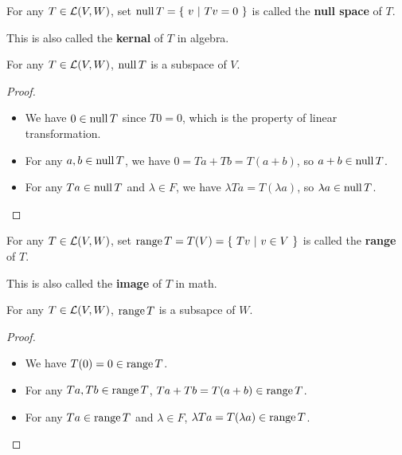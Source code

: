 \documentclass[../main.tex]{subfiles}
\begin{document}
\setcounter{definition}{10}
\begin{definition}
  For any $T \in \mathcal{L}(V, W)$, set $\operatorname{null} T = \{ \ v \ | \ Tv = 0 \ \}$ is called the \textbf{null space} of $T$.
\end{definition}

This is also called the \textbf{kernal} of $T$ in algebra.

\setcounter{theorem}{12}
\begin{theorem}
  For any $T \in \mathcal{L}(V, W)$, $\operatorname{null} T$ is a subspace of $V$.
\end{theorem}
\begin{proof}
  ~
  \begin{itemize}
    \item We have $0 \in \operatorname{null} T$ since $T0 = 0$, which is the property of linear transformation.
    \item For any $a, b \in \operatorname{null} T$, we have $0 = Ta + Tb = T(a + b)$, so $a + b \in \operatorname{null} T$.
    \item For any $Ta \in \operatorname{null} T$ and $\lambda \in F$, we have $\lambda Ta = T (\lambda a)$, so $\lambda a \in \operatorname{null} T$.
  \end{itemize}
\end{proof}


\setcounter{definition}{14}
\begin{definition}
  For any $T \in \mathcal{L}(V, W)$, set $\operatorname{range} T = T(V) = \{ \ Tv \ | \ v \in V \ \}$ is called the \textbf{range} of $T$.
\end{definition}

This is also called the \textbf{image} of $T$ in math.

\setcounter{theorem}{17}
\begin{theorem}
  For any $T \in \mathcal{L}(V, W)$, $\operatorname{range} T$ is a subsapce of $W$.
\end{theorem}
\begin{proof}
  ~
  \begin{itemize}
    \item We have $T(0) = 0 \in \operatorname{range} T$.
    \item For any $Ta, Tb \in \operatorname{range} T$, $Ta + Tb = T(a + b) \in \operatorname{range} T$.
    \item For any $Ta \in \operatorname{range} T$ and $\lambda \in F$, $\lambda Ta = T(\lambda a) \in \operatorname{range} T$.
  \end{itemize}
\end{proof}
\end{document}
